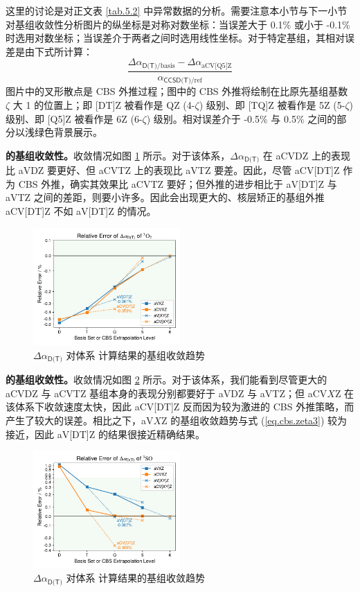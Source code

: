 这里的讨论是对正文表 \ref{tab.5.2} 中异常数据的分析。需要注意本小节与下一小节对基组收敛性分析图片的纵坐标是对称对数坐标：当误差大于 0.1\% 或小于 -0.1\% 时选用对数坐标；当误差介于两者之间时选用线性坐标。对于特定基组，其相对误差是由下式所计算：
\begin{equation*}
    \frac{\Delta \alpha_{\textsf{D(T)} / \text{basis}} - \Delta \alpha_{\text{aCV[Q5]Z}}}{\alpha_{\textsf{CCSD(T)} / \text{ref}}}
\end{equation*}
图片中的叉形散点是 CBS 外推过程；图中的 CBS 外推将绘制在比原先基组基数 $\zeta$ 大 1 的位置上；即 [DT]Z 被看作是 QZ (4-$\zeta$) 级别、即 [TQ]Z 被看作是 5Z (5-$\zeta$) 级别、即 [Q5]Z 被看作是 6Z (6-$\zeta$) 级别。相对误差介于 -0.5\% 与 0.5\% 之间的部分以浅绿色背景展示。

\textbf{ 的基组收敛性。}收敛情况如图 \ref{fig.O2-iso} 所示。对于该体系，$\Delta \alpha_\textsf{D(T)}$ 在 aCVDZ 上的表现比 aVDZ 要更好、但 aCVTZ 上的表现比 aVTZ 要差。因此，尽管 aCV[DT]Z 作为 CBS 外推，确实其效果比 aCVTZ 要好；但外推的进步相比于 aV[DT]Z 与 aVTZ 之间的差距，则要小许多。因此会出现更大的、核层矫正的基组外推 aCV[DT]Z 不如 aV[DT]Z 的情况。

\begin{figure}[ht]
    \centering
    \caption{$\Delta \alpha_\textsf{D(T)}$ 对体系  计算结果的基组收敛趋势}
    \label{fig.O2-iso}
    \includegraphics[width=0.5\textwidth]{assets/O2-iso.pdf}
\end{figure}

\textbf{ 的基组收敛性。}收敛情况如图 \ref{fig.SO-iso} 所示。对于该体系，我们能看到尽管更大的 aCVDZ 与 aCVTZ 基组本身的表现分别都要好于 aVDZ 与 aVTZ；但 aCV$X$Z 在该体系下收敛速度太快，因此 aCV[DT]Z 反而因为较为激进的 CBS 外推策略，而产生了较大的误差。相比之下，aV$X$Z 的基组收敛趋势与式 (\ref{eq.cbs.zeta3}) 较为接近，因此 aV[DT]Z 的结果很接近精确结果。

\begin{figure}[ht]
    \centering
    \caption{$\Delta \alpha_\textsf{D(T)}$ 对体系  计算结果的基组收敛趋势}
    \label{fig.SO-iso}
    \includegraphics[width=0.5\textwidth]{assets/SO-iso.pdf}
\end{figure}

